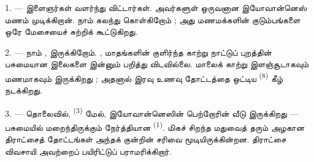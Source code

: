 %
%
%

\VUsaut{4.0mm}
\VUsaut{1.6mm}
\VUsaut{3.2mm}

\VUsaut{1.6mm}
\VUsaut{2.6mm}

\VUsaut{3.0mm}

1. --- இளைஞர்கள் வளர்ந்து விட்டார்கள். அவர்களுள் ஒருவனான இயோவான்னெஸ்
மணம் முடிக்கிறான்.  நாம் கலந்து கொள்கிறோம் ;
அது மணமக்களின் குடும்பங்களை ஒரே மேசையைச் சுற்றிக் கூட்டுகிறது.

2. --- நாம் , 
இருக்கிறோம். ,  மாதங்களின் குளிர்ந்த காற்று
நாட்டுப் புறத்தின் பசுமையான இலைகளை இன்னும் பறித்து விடவில்லை. மாலைக் காற்று
இளஞ்சூடாகவும் மணமாகவும் இருக்கிறது ; அதனால் இரவு உணவு தோட்டத்தை ஒட்டிய
 \textsuperscript{(8)} கீழ் நடக்கிறது.

3. --- தொலைவில்,  \textsuperscript{(3)} மேல், இயோவான்னெஸின்
பெற்றோரின் வீடு இருக்கிறது — பசுமையில் மறைந்திருக்கும் நேர்த்தியான
 \textsuperscript{(1)}. மிகச் சிறந்த மதுவைத் தரும் அழகான
திராட்சைத் தோட்டங்கள் அந்தக் குன்றின் சரிவை மூடியிருக்கின்றன. திராட்சை
விவசாயி அவற்றைப் பயிரிட்டுப் பராமரிக்கிறார்.

